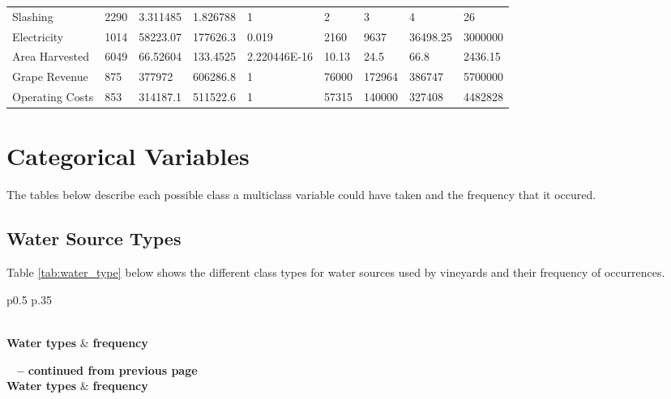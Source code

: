 \documentclass[review,12pt,authoryear]{elsarticle}
\begin{document}
\begin{linenumbers}
\begin{table}[htb]
{\begin{tabular}{@{}lllllllll@{}}
  Slashing & 2290 & 3.311485 & 1.826788 & 1 & 2 & 3 & 4 & 26 \\
  Electricity & 1014 & 58223.07 & 177626.3 & 0.019 & 2160 & 9637 & 36498.25 & 3000000 \\
  Area Harvested & 6049 & 66.52604 & 133.4525 & 2.220446E-16 & 10.13 & 24.5 & 66.8 & 2436.15 \\
  Grape Revenue & 875 & 377972 & 606286.8 & 1 & 76000 & 172964 & 386747 & 5700000 \\
  Operating Costs & 853 & 314187.1 & 511522.6 & 1 & 57315 & 140000 & 327408 & 4482828 \\ \bottomrule
  \end{tabular}}
  \end{table}
\clearpage

  \section{Categorical Variables}
  The tables below describe each possible class a multiclass variable could have taken and the frequency that it occured.
  \subsection{Water Source Types}
  Table \ref{tab:water_type} below shows the different class types for water sources used by vineyards and their frequency of occurrences.

\begin{center}
  \begin{longtable}{p{0.5\linewidth} p{.35\linewidth}}
    \caption{Frequency and class types of water types used by vineyards.}\label{tab:water_type} \\
  
  \hline \textbf{Water types} & \textbf{frequency}\\ \hline 
  \endfirsthead
  
  {{\bfseries \tablename\ \thetable{} -- continued from previous page}} \\
  \hline \textbf{Water types} & \textbf{frequency} \\ \hline 
  \endhead
  
  \hline {} \\ \hline
  \endfoot
  

\end{longtable}
\end{center}
\end{linenumbers}
\end{document}
